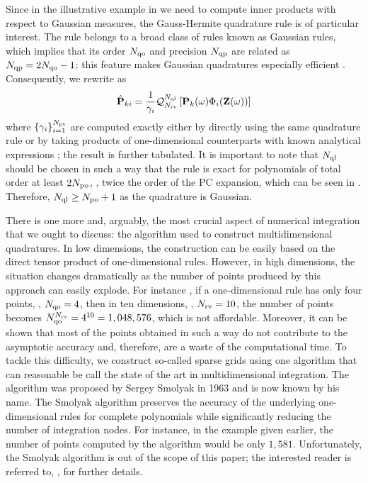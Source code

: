 Since in the illustrative example in  we need to compute inner products with respect to Gaussian measures, the Gauss-Hermite quadrature rule is of particular interest. The rule belongs to a broad class of rules known as Gaussian rules, which implies that its order $N_\text{qo}$ and precision $N_\text{qp}$ are related as $N_\text{qp} = 2 N_\text{qo} - 1$; this feature makes Gaussian quadratures especially efficient \cite{heiss2008}. Consequently, we rewrite  as
\[
  \hat{\mathbf{P}}_{ki} = \frac{1}{\gamma_i} \mathcal{Q}_{{N_\text{rv}}}^{N_\text{ql}}\left[\mathbf{P}_k(\omega) \Phi_i(\mathbf{Z}(\omega))\right]
\]
where $\{ \gamma_i \}_{i = 1}^{{N_\text{pt}}}$ are computed exactly either by directly using the same quadrature rule or by taking products of one-dimensional counterparts with known analytical expressions \cite{xiu2010}; the result is further tabulated. It is important to note that $N_\text{ql}$ should be chosen in such a way that the rule is exact for polynomials of total order at least $2 {N_\text{po}}$, \ie, twice the order of the PC expansion, which can be seen in  \cite{eldred2009}. Therefore, $N_\text{ql} \geq {N_\text{po}} + 1$ as the quadrature is Gaussian.

There is one more and, arguably, the most crucial aspect of numerical integration that we ought to discuss: the algorithm used to construct multidimensional quadratures. In low dimensions, the construction can be easily based on the direct tensor product of one-dimensional rules. However, in high dimensions, the situation changes dramatically as the number of points produced by this approach can easily explode. For instance \cite{heiss2008}, if a one-dimensional rule has only four points, \ie, $N_\text{qo} = 4$, then in ten dimensions, \ie, ${N_\text{rv}} = 10$, the number of points becomes $N_\text{qo}^{{N_\text{rv}}} = 4^{10} = 1,048,576$, which is not affordable. Moreover, it can be shown that most of the points obtained in such a way do not contribute to the asymptotic accuracy and, therefore, are a waste of the computational time. To tackle this difficulty, we construct so-called sparse grids using one algorithm that can reasonable be call the state of the art in multidimensional integration. The algorithm was proposed by Sergey Smolyak in 1963 and is now known by his name. The Smolyak algorithm preserves the accuracy of the underlying one-dimensional rules for complete polynomials while significantly reducing the number of integration nodes. For instance, in the example given earlier, the number of points computed by the algorithm would be only $1,581$. Unfortunately, the Smolyak algorithm is out of the scope of this paper; the interested reader is referred to, \eg, \cite{eldred2009, maitre2010, heiss2008} for further details.
